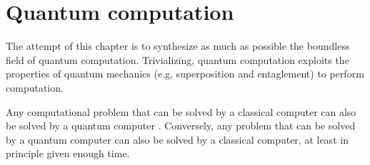 \chapter{Quantum computation}
The attempt of this chapter is to synthesize as much as possible the boundless field of quantum computation. Trivializing, quantum computation exploits the properties of quantum mechanics (e.g, superposition and entaglement) to perform computation.

Any computational problem that can be solved by a classical computer can also be solved by a quantum computer \cite[29]{NielsenChuang}. Conversely, any problem that can be solved by a quantum computer can also be solved by a classical computer, at least in principle given enough time.



